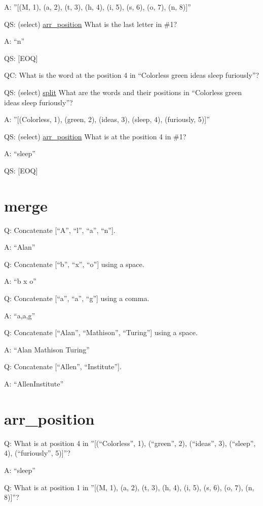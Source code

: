 \documentclass[
]{article}
\begin{document}
A: ''{[}(M, 1), (a, 2), (t, 3), (h, 4), (i, 5), (s, 6), (o, 7), (n,
8){]}''

QS: (select) \hyperref[arr_position]{arr\_position} What is the last
letter in \#1?

A: ``n''

QS: {[}EOQ{]}

QC: What is the word at the position 4 in ``Colorless green ideas sleep
furiously''?

QS: (select) \hyperref[split]{split} What are the words and their
positions in ``Colorless green ideas sleep furiously''?

A: ''{[}(Colorless, 1), (green, 2), (ideas, 3), (sleep, 4), (furiously,
5){]}''

QS: (select) \hyperref[arr_position]{arr\_position} What is at the
position 4 in \#1?

A: ``sleep''

QS: {[}EOQ{]}

\section{merge}\label{merge}

Q: Concatenate {[}``A'', ``l'', ``a'', ``n''{]}.

A: ``Alan''

Q: Concatenate {[}``b'', ``x'', ``o''{]} using a space.

A: ``b x o''

Q: Concatenate {[}``a'', ``a'', ``g''{]} using a comma.

A: ``a,a,g''

Q: Concatenate {[}``Alan'', ``Mathison'', ``Turing''{]} using a space.

A: ``Alan Mathison Turing''

Q: Concatenate {[}``Allen'', ``Institute''{]}.

A: ``AllenInstitute''

\section{arr\_position}\label{arr_position}

Q: What is at position 4 in ''{[}(``Colorless'', 1), (``green'', 2),
(``ideas'', 3), (``sleep'', 4), (``furiously'', 5){]}''?

A: ``sleep''

Q: What is at position 1 in ''{[}(M, 1), (a, 2), (t, 3), (h, 4), (i, 5),
(s, 6), (o, 7), (n, 8){]}''?
\end{document}
